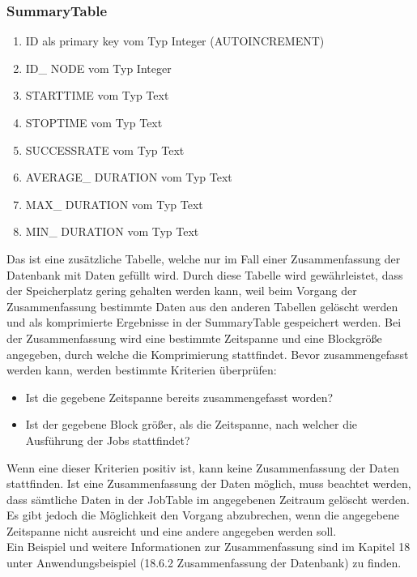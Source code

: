 \documentclass[12pt,a4paper]{report}
\begin{document}
\begin{onehalfspace}
\subsubsection{SummaryTable}
\begin{enumerate}
\item ID als primary key vom Typ Integer (AUTOINCREMENT)
\item ID\_ NODE vom Typ Integer
\item STARTTIME vom Typ Text
\item STOPTIME vom Typ Text
\item SUCCESSRATE vom Typ Text
\item AVERAGE\_ DURATION vom Typ Text
\item MAX\_ DURATION vom Typ Text
\item MIN\_ DURATION vom Typ Text
\end{enumerate}
Das ist eine zusätzliche Tabelle, welche nur im Fall einer Zusammenfassung der Datenbank mit Daten gefüllt wird.  Durch diese Tabelle wird gewährleistet, dass der Speicherplatz gering gehalten werden kann, weil beim Vorgang der Zusammenfassung bestimmte Daten aus den anderen Tabellen gelöscht werden und als komprimierte Ergebnisse in der SummaryTable gespeichert werden. Bei der Zusammenfassung wird eine bestimmte Zeitspanne und eine Blockgröße angegeben, durch welche die Komprimierung stattfindet. Bevor zusammengefasst werden kann, werden bestimmte Kriterien überprüfen:
\begin{itemize}
\item Ist die gegebene Zeitspanne bereits zusammengefasst worden?
\item Ist der gegebene Block größer, als die Zeitspanne, nach welcher die Ausführung der Jobs stattfindet?
\end{itemize}
Wenn eine dieser Kriterien positiv ist, kann keine Zusammenfassung der Daten stattfinden.
Ist eine Zusammenfassung der Daten möglich, muss beachtet werden, dass sämtliche Daten in der JobTable im angegebenen Zeitraum gelöscht werden.\\

Es gibt jedoch die Möglichkeit den Vorgang abzubrechen, wenn die angegebene Zeitspanne nicht ausreicht und eine andere angegeben werden soll.\\

Ein Beispiel und weitere Informationen zur Zusammenfassung sind im Kapitel 18 unter Anwendungsbeispiel (18.6.2 Zusammenfassung der Datenbank) zu finden.\\


\end{onehalfspace}
\end{document}
